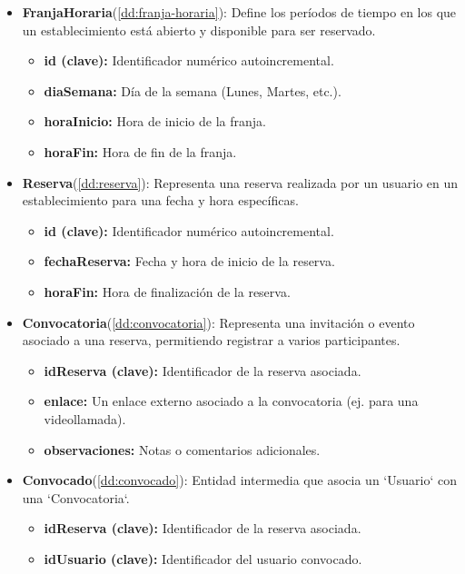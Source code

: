 \newpage

\begin{itemize}
	\item \textbf{FranjaHoraria}(\ref{dd:franja-horaria}): Define los períodos de tiempo en los que un establecimiento está abierto y disponible para ser reservado.
	\begin{itemize}
       \item \textbf{id (clave):} Identificador numérico autoincremental.
       \item \textbf{diaSemana:} Día de la semana (Lunes, Martes, etc.).
       \item \textbf{horaInicio:} Hora de inicio de la franja.
       \item \textbf{horaFin:} Hora de fin de la franja.
	\end{itemize}
\end{itemize}

\begin{itemize}
	\item \textbf{Reserva}(\ref{dd:reserva}): Representa una reserva realizada por un usuario en un establecimiento para una fecha y hora específicas.
	\begin{itemize}
       \item \textbf{id (clave):} Identificador numérico autoincremental.
       \item \textbf{fechaReserva:} Fecha y hora de inicio de la reserva.
       \item \textbf{horaFin:} Hora de finalización de la reserva.
	\end{itemize}
\end{itemize}

\begin{itemize}
	\item \textbf{Convocatoria}(\ref{dd:convocatoria}): Representa una invitación o evento asociado a una reserva, permitiendo registrar a varios participantes.
	\begin{itemize}
       \item \textbf{idReserva (clave):} Identificador de la reserva asociada.
       \item \textbf{enlace:} Un enlace externo asociado a la convocatoria (ej. para una videollamada).
       \item \textbf{observaciones:} Notas o comentarios adicionales.
	\end{itemize}
\end{itemize}

\begin{itemize}
	\item \textbf{Convocado}(\ref{dd:convocado}): Entidad intermedia que asocia un `Usuario` con una `Convocatoria`.
	\begin{itemize}
       \item \textbf{idReserva (clave):} Identificador de la reserva asociada.
       \item \textbf{idUsuario (clave):} Identificador del usuario convocado.
	\end{itemize}
\end{itemize}

